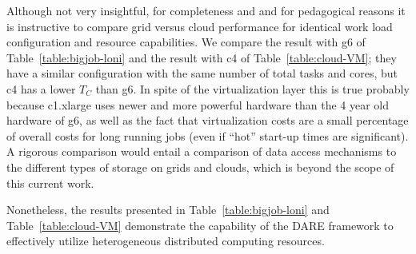 \documentclass{cpeauth}
\begin{document}
Although not very insightful, for completeness and and for pedagogical
reasons it is instructive to compare grid versus cloud performance for
identical work load configuration and resource capabilities.  We
compare the result with g6 of Table~\ref{table:bigjob-loni} and the
result with c4 of Table~\ref{table:cloud-VM}; they have a similar
configuration with the same number of total tasks and cores, but c4
has a lower $T_C$ than g6. In spite of the virtualization layer this
is true probably because c1.xlarge uses newer and more powerful
hardware than the 4 year old hardware of g6, as well as the fact that
virtualization costs are a small percentage of overall costs for long
running jobs (even if ``hot'' start-up times are significant).  A
rigorous comparison would entail a comparison of data access
mechanisms to the different types of storage on grids and clouds,
which is beyond the scope of this current work.

Nonetheless, the results presented in Table~\ref{table:bigjob-loni}
and Table~\ref{table:cloud-VM} demonstrate the capability of the DARE
framework to effectively utilize heterogeneous distributed computing
resources.





\end{document}
